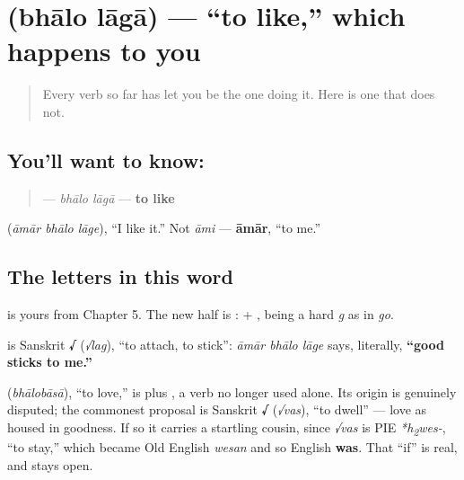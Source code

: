 \section[bhālo lāgā]{  (bhālo lāgā) — \textquotedblleft{}to like,\textquotedblright{} which happens to you}

\label{lesson:BN-C09-bhalo-laga}



\begin{quote}
Every verb so far has let you be the one doing it. Here is one that does not.
\end{quote}

\subsection*{You'll want to know:  }
\begin{quote}
\textbf{ } — \emph{bhālo lāgā} — \textbf{to like}
\end{quote}

   (\emph{āmār bhālo lāge}), \textquotedblleft{}I like it.\textquotedblright{} Not \emph{āmi} — \textbf{āmār}, \textquotedblleft{}to me.\textquotedblright{}

\subsection*{The letters in this word}
\textbf{} is yours from Chapter 5. The new half is \textbf{}: \textbf{} + \textbf{}, \textbf{} being a hard \emph{g} as in \emph{go}.

\begin{cousinweb}
\textbf{} is Sanskrit \textbf{√} (\emph{√lag}), \textquotedblleft{}to attach, to stick\textquotedblright{}: \emph{āmār bhālo lāge} says, literally, \textbf{\textquotedblleft{}good sticks to me.\textquotedblright{}}

\textbf{} (\emph{bhālobāsā}), \textquotedblleft{}to love,\textquotedblright{} is  plus \textbf{}, a verb no longer used alone. Its origin is genuinely disputed; the commonest proposal is Sanskrit \textbf{√} (\emph{√vas}), \textquotedblleft{}to dwell\textquotedblright{} — love as housed in goodness. If so it carries a startling cousin, since \emph{√vas} is PIE \emph{*h\textsubscript{2}wes-}, \textquotedblleft{}to stay,\textquotedblright{} which became Old English \emph{wesan} and so English \textbf{was}. That \textquotedblleft{}if\textquotedblright{} is real, and stays open.
\end{cousinweb}

